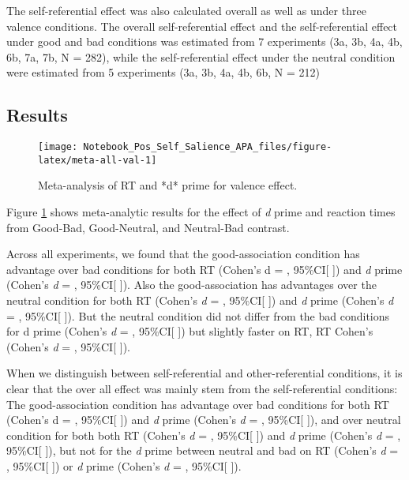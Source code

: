 \documentclass[man]{apa6}
\begin{document}
The self-referential effect was also calculated overall as well as under three valence conditions. The overall self-referential effect and the self-referential effect under good and bad conditions was estimated from 7 experiments (3a, 3b, 4a, 4b, 6b, 7a, 7b, N = 282), while the self-referential effect under the neutral condition were estimated from 5 experiments (3a, 3b, 4a, 4b, 6b, N = 212)

\hypertarget{results-11}{%
\subsection{Results}\label{results-11}}

\begin{figure}

{\centering \texttt{[image: Notebook\_Pos\_Self\_Salience\_APA\_files/figure-latex/meta-all-val-1]} 

}

\caption{Meta-analysis of RT and *d* prime for valence effect.}\label{fig:meta-all-val}
\end{figure}

Figure \ref{fig:meta-all-val} shows meta-analytic results for the effect of \emph{d} prime and reaction times from Good-Bad, Good-Neutral, and Neutral-Bad contrast.

Across all experiments, we found that the good-association condition has advantage over bad conditions for both RT (Cohen's d = , 95\%CI{[} {]}) and \emph{d} prime (Cohen's \emph{d} = , 95\%CI{[} {]}). Also the good-association has advantages over the neutral condition for both RT (Cohen's \emph{d} = , 95\%CI{[} {]}) and \emph{d} prime (Cohen's \emph{d} = , 95\%CI{[} {]}). But the neutral condition did not differ from the bad conditions for d prime (Cohen's \emph{d} = , 95\%CI{[} {]}) but slightly faster on RT, RT Cohen's (Cohen's \emph{d} = , 95\%CI{[} {]}).

When we distinguish between self-referential and other-referential conditions, it is clear that the over all effect was mainly stem from the self-referential conditions: The good-association condition has advantage over bad conditions for both RT (Cohen's d = , 95\%CI{[} {]}) and \emph{d} prime (Cohen's \emph{d} = , 95\%CI{[} {]}), and over neutral condition for both both RT (Cohen's \emph{d} = , 95\%CI{[} {]}) and \emph{d} prime (Cohen's \emph{d} = , 95\%CI{[} {]}), but not for the \emph{d} prime between neutral and bad on RT (Cohen's \emph{d} = , 95\%CI{[} {]}) or \emph{d} prime (Cohen's \emph{d} = , 95\%CI{[} {]}).
\end{document}
